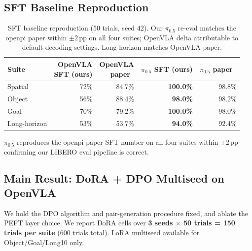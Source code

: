 \documentclass{article}
\begin{document}
\subsection{SFT Baseline Reproduction}

\begin{table}[ht]
\centering
\caption{SFT baseline reproduction (50 trials, seed 42). Our \(\pi_{0.5}\) re-eval matches the openpi paper within \(\pm 2\)\,pp on all four suites; OpenVLA delta attributable to default decoding settings. Long-horizon matches OpenVLA paper.}
\setlength{\tabcolsep}{5pt}
\begin{tabular}{lrrrr}
\toprule
Suite & \makecell[r]{OpenVLA\\SFT (ours)} & \makecell[r]{OpenVLA\\paper~\cite{kim2024openvla}} & \makecell[r]{\(\pi_{0.5}\)\\SFT (ours)} & \makecell[r]{\(\pi_{0.5}\)\\paper~\cite{openpi2025pi05}} \\
\midrule
Spatial & 72\% & 84.7\% & \textbf{100.0\%} & 98.8\% \\
Object & 56\% & 88.4\% & \textbf{98.0\%} & 98.2\% \\
Goal & 70\% & 79.2\% & \textbf{100.0\%} & 98.0\% \\
Long-horizon & 53\% & 53.7\% & \textbf{94.0\%} & 92.4\% \\
\bottomrule
\end{tabular}
\end{table}

\(\pi_{0.5}\) reproduces the openpi-paper SFT number on all four suites within \(\pm 2\)\,pp---confirming our LIBERO eval pipeline is correct.

\subsection{Main Result: DoRA + DPO Multiseed on OpenVLA}\label{sec:main-result}

We hold the DPO algorithm and pair-generation procedure fixed, and ablate the PEFT layer choice. We report DoRA cells over \textbf{3 seeds \(\times\) 50 trials = 150 trials per suite} (600 trials total). LoRA multiseed available for Object/Goal/Long10 only.
\end{document}
